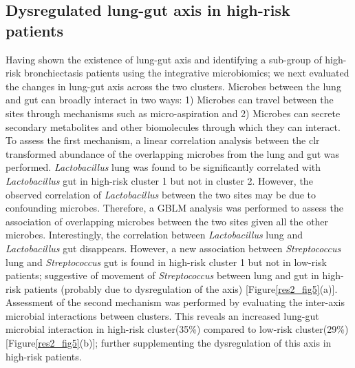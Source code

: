 \subsection{Dysregulated lung-gut axis in high-risk patients}
Having shown the existence of lung-gut axis and identifying a sub-group of high-risk bronchiectasis patients using the integrative microbiomics; we next evaluated the changes in lung-gut axis across the two clusters. Microbes between the lung and gut can broadly interact in two ways: 1) Microbes can travel between the sites through mechanisms such as micro-aspiration and 2) Microbes can secrete secondary metabolites and other biomolecules through which they can interact. To assess the first mechanism, a linear correlation analysis between the clr transformed abundance of the overlapping microbes from the lung and gut was performed. \emph{Lactobacillus} lung was found to be significantly correlated with  \emph{Lactobacillus} gut in high-risk cluster 1 but not in cluster 2. However, the observed correlation of \emph{Lactobacillus} between the two sites may be due to confounding microbes. Therefore, a GBLM analysis was performed to assess the association of overlapping microbes between the two sites given all the other microbes. Interestingly, the correlation between \emph{Lactobacillus} lung and \emph{Lactobacillus} gut disappears. However, a new association between \emph{Streptococcus} lung and \emph{Streptococcus} gut is found in high-risk cluster 1 but not in low-risk patients; suggestive of movement of \emph{Streptococcus} between lung and gut in high-risk patients (probably due to dysregulation of the axis) [Figure\ref{res2_fig5}(a)]. Assessment of the second mechanism was performed by evaluating the inter-axis microbial interactions between clusters. This reveals an increased lung-gut microbial interaction in high-risk cluster(35\%) compared to low-risk cluster(29\%) [Figure\ref{res2_fig5}(b)]; further supplementing the dysregulation of this axis in high-risk patients.

